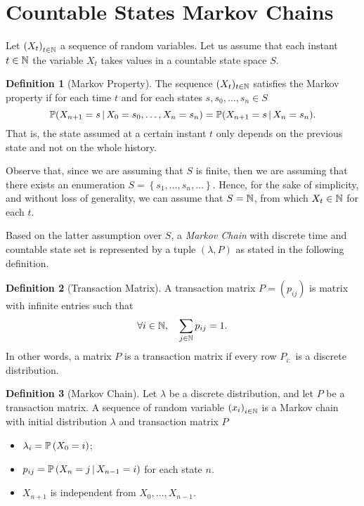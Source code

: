 \documentclass{report}
\theoremstyle{definition}
\newtheorem{defn}{Definition}
\begin{document}
\section{Countable States Markov Chains}
Let $\left( X_t \right)_{t\in\mathbb{N}}$ a sequence of random variables. Let us
assume that each instant $t\in\mathbb{N}$ the variable $X_t$ takes values in a countable state space $S$. 
\begin{defn}[Markov Property]
The sequence $(X_t)_{t\in\mathbb{N}}$ satisfies the Markov property if for each time
$t$ and for each states $s,s_0,\dots,s_n\in S$
\begin{equation}
  \mathbb{P}(X_{n+1}=s\,\vert\,
  X_0=s_0,\dots,X_n=s_n)=\mathbb{P}(X_{n+1}=s\,\vert\, X_n=s_n).
  \label{eq:markov-property}
\end{equation}
That is, the state assumed at a certain instant $t$ only depends on the
previous state and not on the whole history.
\end{defn}

Observe that, since we are assuming that $S$ is finite, then we are assuming
that there exists an enumeration $S=\left\{ s_1,\dots,s_n,\dots \right\}$.
Hence,  for the sake of simplicity, and without loss of generality, we can
assume that $S=\mathbb{N}$, from which $X_t\in\mathbb{N}$ for each $t$.

Based on the latter assumption over $S$, a \textit{Markov Chain}  with
discrete time and countable state set is represented by a tuple 
$\left( \lambda,P \right)$ as stated in the following definition.

\begin{defn}[Transaction Matrix]
  A transaction matrix $P=\left( p_{ij} \right)$ is matrix with infinite entries 
  such that
  \begin{equation}
    \forall i\in\mathbb{N},\quad \sum_{j\in\mathbb{N}} p_{ij} = 1.
    \label{eq:transaction-matrix}
  \end{equation}
  In other words, a matrix $P$ is a transaction matrix if every row $P_{i:}$
  is a discrete distribution.
\end{defn}
\begin{defn}[Markov Chain]
  Let $\lambda$ be a discrete distribution, and let $P$ be a transaction
  matrix. A sequence of random variable $\left( x_i \right)_{i\in\mathbb{N}}$ is a
  Markov chain with initial distribution $\lambda$ and transaction matrix
  $P$ 
  \begin{itemize}
    \item $\lambda_i = \mathbb{P}\left( X_0=i \right)$;
    \item $p_{ij} = \mathbb{P}\left( X_n=j\,\vert\, X_{n-1}=i \right)$ for each
      state $n$.
    \item $X_{n+1}$ is independent from $X_0,\dots,X_{n-1}$.
  \end{itemize}
\end{defn}
\end{document}
